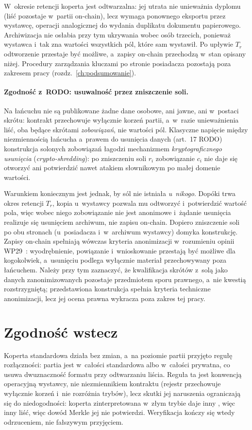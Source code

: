 W~okresie retencji koperta jest odtwarzalna: jej utrata nie unieważnia dyplomu
(liść pozostaje w~partii on-chain), lecz wymaga ponownego eksportu przez
wystawcę, operacji analogicznej do wydania duplikatu dokumentu papierowego.
Archiwizacja nie osłabia przy tym ukrywania wobec osób trzecich, ponieważ
wystawca i~tak zna wartości wszystkich pól, które sam wystawił. Po upływie $T_r$
odtworzenie przestaje być możliwe, a~zapisy on-chain przechodzą w~stan opisany
niżej. Procedury zarządzania kluczami po stronie posiadacza pozostają poza
zakresem pracy (rozdz.~\ref{ch:podsumowanie}).

\paragraph{Zgodność z~RODO: usuwalność przez zniszczenie soli.} Na łańcuchu
nie są publikowane żadne dane osobowe, ani jawne, ani w~postaci skrótu:
kontrakt przechowuje wyłącznie korzeń partii, a~w~razie unieważnienia
liść, oba będące skrótami \emph{zobowiązań}, nie wartości pól. Klasyczne
napięcie między niezmiennością łańcucha a~prawem do usunięcia danych
(art.~17 RODO)~\cite{cnil2018} konstrukcja solonych zobowiązań łagodzi
mechanizmem \emph{kryptograficznego usunięcia} (\emph{crypto-shredding}):
po zniszczeniu soli $r_i$ zobowiązanie $c_i$ nie daje się otworzyć ani
potwierdzić nawet atakiem słownikowym po małej domenie wartości.

Warunkiem koniecznym jest jednak, by sól nie istniała \emph{u~nikogo}. Dopóki
trwa okres retencji $T_r$, kopia u~wystawcy pozwala mu odtworzyć i~potwierdzić
wartość pola, więc wobec niego zobowiązanie nie jest anonimowe i~żądanie
usunięcia realizuje się usunięciem archiwum, nie zapisu on-chain. Dopiero
zniszczenie soli po obu stronach (u~posiadacza i~w~archiwum wystawcy)
domyka konstrukcję. Zapisy on-chain spełniają wówczas kryteria anonimizacji
w~rozumieniu opinii WP29~\cite{wp29-anonymisation}: wyodrębnienie, powiązanie
i~wnioskowanie przestają być możliwe dla kogokolwiek, a~usunięciu podlega
wyłącznie materiał przechowywany poza łańcuchem. Należy przy tym
zaznaczyć, że kwalifikacja skrótów z~solą jako danych zanonimizowanych pozostaje
przedmiotem sporu prawnego, a~nie kwestią rozstrzygniętą; przedstawiona
konstrukcja spełnia kryteria techniczne anonimizacji, lecz jej ocena prawna
wykracza poza zakres tej pracy.

\section{Zgodność wstecz}
\label{sec:priv-zgodnosc}

Koperta standardowa działa bez zmian, a~na poziomie partii przyjęto regułę
rozłączności: partia jest w~całości standardowa albo w~całości prywatna, co usuwa
dwuznaczność formatu  przy odtwarzaniu liścia. Reguła ta jest
konwencją operacyjną wystawcy, nie niezmiennikiem kontraktu (rejestr
przechowuje wyłącznie korzeń i~nie rozróżnia trybów), lecz skutki jej
naruszenia ograniczają się do niedogodności: koperta zinterpretowana w~złym
trybie daje inny , więc inny liść, więc dowód Merkle jej nie
potwierdzi. Weryfikacja kończy się wtedy odrzuceniem, nie fałszywym przyjęciem.
